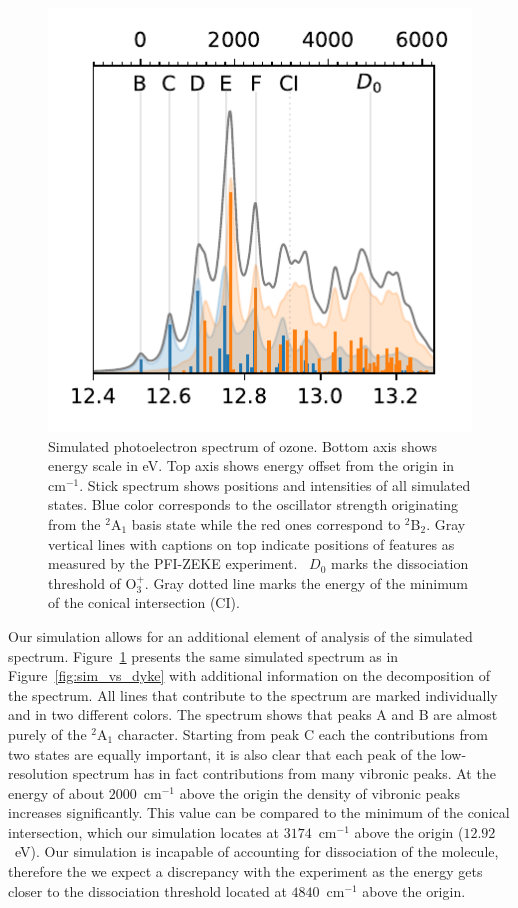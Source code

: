 \documentclass[12pt,prb,aps]{revtex4-2}
\begin{document}
\begin{figure}
    \includegraphics[width=10 cm]{figures/spectrum_overline}
    \caption{
        Simulated photoelectron spectrum of ozone. Bottom axis shows energy
        scale in eV. Top axis shows energy offset from the origin in
        cm$^{-1}$. Stick spectrum shows positions and intensities of all
        simulated states. Blue color corresponds to the oscillator strength
        originating from the $^2$A$_1$ basis state while the red ones
        correspond to $^2$B$_2$. Gray vertical lines with captions on top
        indicate positions of features as measured by the PFI-ZEKE
        experiment.~\cite{Willitsch:O3ZEKE:2005} 
        $D_0$ marks the dissociation threshold of O$_3^+$.
        Gray dotted line marks the energy of the minimum of the conical
        intersection (CI).
    }
    \label{fig:ozone_overlay}
\end{figure}

Our simulation allows for an additional element of analysis of the simulated
spectrum. Figure~\ref{fig:ozone_overlay} presents the same simulated spectrum
as in Figure~\ref{fig:sim_vs_dyke} with additional information on the
decomposition of the spectrum.  All lines that contribute to the spectrum are
marked individually and in two different colors. The spectrum shows that peaks
A and B are almost purely of the $^2$A$_1$ character. Starting from peak C
each the contributions from two states are equally important, it is also clear
that each peak of the low-resolution spectrum has in fact contributions from
many vibronic peaks. At the energy of about $2000$~cm$^{-1}$ above the origin
the density of vibronic peaks increases significantly. This value can be
compared to the minimum of the conical intersection, which our simulation
locates at $3174$~cm$^{-1}$ above the origin ($12.92$~eV). Our simulation is
incapable of accounting for dissociation of the molecule, therefore the we
expect a discrepancy with the experiment as the energy gets closer to the
dissociation threshold located at $4840$~cm$^{-1}$ above the
origin.~\cite{Willitsch:O3ZEKE:2005}
\end{document}
